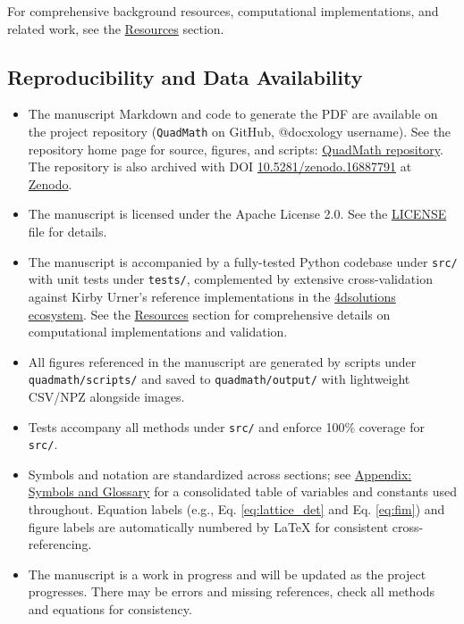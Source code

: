 \documentclass[
  10pt,
]{article}
\newcommand{\passthrough}[1]{#1}
\providecommand{\tightlist}{%
  \setlength{\itemsep}{0pt}\setlength{\parskip}{0pt}}
\begin{document}
For comprehensive background resources, computational implementations,
and related work, see the \href{07_resources.md}{Resources} section.

\hypertarget{reproducibility-and-data-availability}{%
\subsection{Reproducibility and Data
Availability}\label{reproducibility-and-data-availability}}

\begin{itemize}
\tightlist
\item
  The manuscript Markdown and code to generate the PDF are available on
  the project repository (\passthrough{\lstinline!QuadMath!} on GitHub,
  @docxology username). See the repository home page for source,
  figures, and scripts:
  \href{https://github.com/docxology/QuadMath}{QuadMath repository}. The
  repository is also archived with DOI
  \href{https://zenodo.org/records/16887791}{10.5281/zenodo.16887791} at
  \href{https://zenodo.org/records/16887791}{Zenodo}.
\item
  The manuscript is licensed under the Apache License 2.0. See the
  \href{../LICENSE}{LICENSE} file for details.
\item
  The manuscript is accompanied by a fully-tested Python codebase under
  \passthrough{\lstinline!src/!} with unit tests under
  \passthrough{\lstinline!tests/!}, complemented by extensive
  cross-validation against Kirby Urner's reference implementations in
  the \href{https://github.com/4dsolutions}{4dsolutions ecosystem}. See
  the \href{07_resources.md}{Resources} section for comprehensive
  details on computational implementations and validation.
\item
  All figures referenced in the manuscript are generated by scripts
  under \passthrough{\lstinline!quadmath/scripts/!} and saved to
  \passthrough{\lstinline!quadmath/output/!} with lightweight CSV/NPZ
  alongside images.
\item
  Tests accompany all methods under \passthrough{\lstinline!src/!} and
  enforce 100\% coverage for \passthrough{\lstinline!src/!}.
\item
  Symbols and notation are standardized across sections; see
  \href{10_symbols_glossary.md}{Appendix: Symbols and Glossary} for a
  consolidated table of variables and constants used throughout.
  Equation labels (e.g., Eq. \eqref{eq:lattice_det} and Eq.
  \eqref{eq:fim}) and figure labels are automatically numbered by LaTeX
  for consistent cross-referencing.
\item
  The manuscript is a work in progress and will be updated as the
  project progresses. There may be errors and missing references, check
  all methods and equations for consistency.
\end{itemize}
\end{document}
